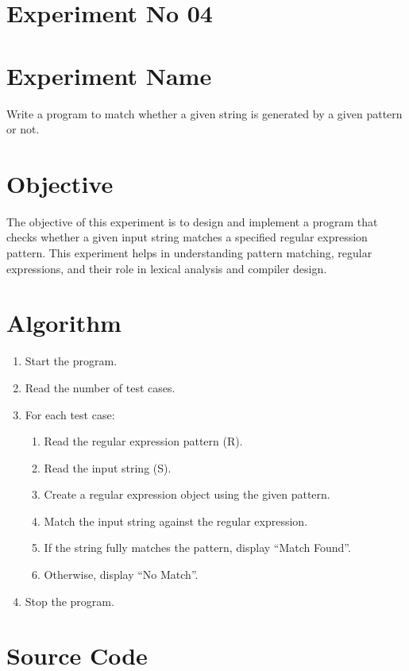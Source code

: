 \documentclass[12pt]{article}
\begin{document}
\vspace{1cm}

\section*{Experiment No 04}

\section*{Experiment Name}
Write a program to match whether a given string is generated by a given pattern or not.

\section*{Objective}
The objective of this experiment is to design and implement a program that checks whether a given input string matches a specified regular expression pattern. This experiment helps in understanding pattern matching, regular expressions, and their role in lexical analysis and compiler design.

\section*{Algorithm}
\begin{enumerate}
    \item Start the program.
    \item Read the number of test cases.
    \item For each test case:
    \begin{enumerate}
        \item Read the regular expression pattern (R).
        \item Read the input string (S).
        \item Create a regular expression object using the given pattern.
        \item Match the input string against the regular expression.
        \item If the string fully matches the pattern, display ``Match Found''.
        \item Otherwise, display ``No Match''.
    \end{enumerate}
    \item Stop the program.
\end{enumerate}

\newpage

\section*{Source Code}
\end{document}
